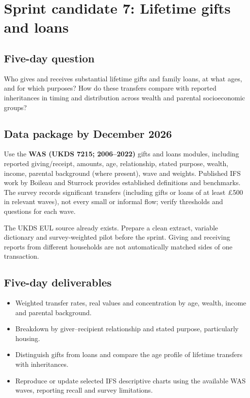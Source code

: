 \section{Sprint candidate 7: Lifetime gifts and loans}
\label{sec:gifts}

\subsection{Five-day question}
Who gives and receives substantial lifetime gifts and family loans, at what ages, and for which purposes? How do these transfers compare with reported inheritances in timing and distribution across wealth and parental socioeconomic groups?

\subsection{Data package by December 2026}
Use the \textbf{WAS (UKDS 7215; 2006--2022)} gifts and loans modules, including reported giving/receipt, amounts, age, relationship, stated purpose, wealth, income, parental background (where present), wave and weights. Published IFS work by Boileau and Sturrock provides established definitions and benchmarks. The survey records significant transfers (including gifts or loans of at least \pounds500 in relevant waves), not every small or informal flow; verify thresholds and questions for each wave.

The UKDS EUL source already exists. Prepare a clean extract, variable dictionary and survey-weighted pilot before the sprint. Giving and receiving reports from different households are not automatically matched sides of one transaction.

\subsection{Five-day deliverables}
\begin{itemize}[nosep]
\item Weighted transfer rates, real values and concentration by age, wealth, income and parental background.
\item Breakdown by giver--recipient relationship and stated purpose, particularly housing.
\item Distinguish gifts from loans and compare the age profile of lifetime transfers with inheritances.
\item Reproduce or update selected IFS descriptive charts using the available WAS waves, reporting recall and survey limitations.
\end{itemize}

